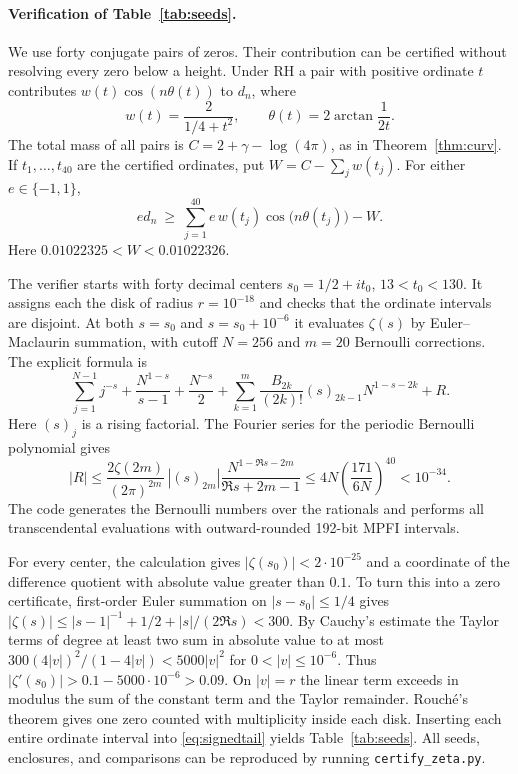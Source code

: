\paragraph{Verification of Table~\ref{tab:seeds}.}
We use forty conjugate pairs of zeros. Their contribution can be certified
without resolving every zero below a height. Under RH a pair with positive
ordinate $t$ contributes $w(t)\cos(n\theta(t))$ to $d_n$, where
\[
 w(t)=\frac{2}{1/4+t^2},\qquad
 \theta(t)=2\arctan\!\frac{1}{2t}.
\]
The total mass of all pairs is $C=2+\gamma-\log(4\pi)$, as in
Theorem~\ref{thm:curv}. If $t_1,\ldots,t_{40}$ are the certified
ordinates, put $W=C-\sum_j w(t_j)$. For either $e\in\{-1,1\}$,
\begin{equation}
 ed_n\ \ge\ \sum_{j=1}^{40}e\,w(t_j)\cos\bigl(n\theta(t_j)\bigr)-W.
 \label{eq:signedtail}
\end{equation}
Here $0.01022325<W<0.01022326$.

The verifier starts with forty decimal centers $s_0=1/2+it_0$,
$13<t_0<130$. It assigns each the disk of radius $r=10^{-18}$ and
checks that the ordinate intervals are disjoint. At both $s=s_0$ and
$s=s_0+10^{-6}$ it evaluates $\zeta(s)$ by Euler--Maclaurin summation,
with cutoff $N=256$ and $m=20$ Bernoulli corrections. The explicit formula is
\[
 \sum_{j=1}^{N-1} j^{-s} + \frac{N^{1-s}}{s-1} + \frac{N^{-s}}{2}
 + \sum_{k=1}^{m}\frac{B_{2k}}{(2k)!}(s)_{2k-1}N^{1-s-2k} + R.
\]
Here $(s)_j$ is a rising factorial. The Fourier series for the periodic
Bernoulli polynomial gives
\[
 |R|\le \frac{2\zeta(2m)}{(2\pi)^{2m}}\,
 |(s)_{2m}|\frac{N^{1-\Re s-2m}}{\Re s+2m-1}
 \le 4N\left(\frac{171}{6N}\right)^{40}<10^{-34}.
\]
The code generates the Bernoulli numbers over the rationals and performs
all transcendental evaluations with outward-rounded 192-bit MPFI intervals.

For every center, the calculation gives $|\zeta(s_0)|<2\cdot10^{-25}$
and a coordinate of the difference quotient with absolute value greater
than $0.1$. To turn this into a zero certificate, first-order Euler
summation on $|s-s_0|\le1/4$ gives
$|\zeta(s)|\le |s-1|^{-1}+1/2+|s|/(2\Re s)<300$.
By Cauchy's estimate the Taylor terms of degree at least two sum in
absolute value to at most
$300(4|v|)^2/(1-4|v|)<5000|v|^2$ for $0<|v|\le10^{-6}$.
Thus $|\zeta'(s_0)|>0.1-5000\cdot10^{-6}>0.09$.
On $|v|=r$ the linear term exceeds in modulus the sum of the constant
term and the Taylor remainder. Rouch\'e's theorem gives one zero
counted with multiplicity inside each disk. Inserting each entire
ordinate interval into \eqref{eq:signedtail} yields
Table~\ref{tab:seeds}. All seeds, enclosures, and comparisons can be
reproduced by running \texttt{certify\_zeta.py}.
